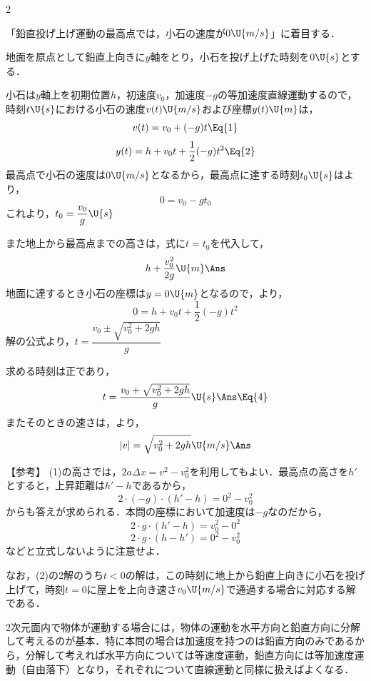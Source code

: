 \begin{multicols}{2}
\begin{sisin}
「鉛直投げ上げ運動の最高点では，小石の速度が$0\U{m/s}$」に着目する．
\end{sisin}
\par\nopagebreak
\hspace{1zw}地面を原点として鉛直上向きに$y$軸をとり，小石を投げ上げた時刻を$0\U{s}$とする．
\begin{komon}
 小石は$y$軸上を初期位置$h$，初速度$v_0$，加速度$-g$の等加速度直線運動するので，時刻$t\U{s}$における小石の速度$v(t)\U{m/s}$および座標$y(t)\U{m}$は，
       \[v(t)=v_0+(-g)t\Eq{1}\]
       \[y(t)=h+v_0t+\frac{1}{2}(-g)t^2\Eq{2}\]
       \hspace{1zw}最高点で小石の速度は$0\U{m/s}$となるから，最高点に達する時刻$t_0\U{s}$はより，
       \[0=v_0-gt_0\]
       これより，$t_0=\dfrac{v_0}{g}\U{s}$\Ans{}\par
       \hspace{1zw}また地上から最高点までの高さは，式に$t=t_0$を代入して，
       \[h+\frac{v_0^2}{2g}\U{m}\Ans\]
 地面に達するとき小石の座標は$y=0\U{m}$となるので，より，
       \[0=h+v_0t+\frac{1}{2}(-g)t^2\]
       解の公式より，$t=\dfrac{v_0\pm\sqrt{v_0^2+2gh}}{g}$\par
       求める時刻は正であり，
       \[t=\frac{v_0+\sqrt{v_0^2+2gh}}{g}\U{s}\Ans\Eq{4}\]
       またそのときの速さは，より，
       \[|v|=\sqrt{v_0^2+2gh}\U{m/s}\Ans\]
\end{komon}
\begin{itembox}[l]{【参考】}
\hspace{1zw}(1)の高さでは，$2a\Delta x=v^2-v_0^2$を利用してもよい．最高点の高さを$h'$とすると，上昇距離は$h'-h$であるから，
\[2\cdot(-g)\cdot(h'-h)=0^2-v_0^2\]
からも答えが求められる．本問の座標において加速度は$-g$なのだから，
\[2\cdot g\cdot(h'-h)=v_0^2-0^2\]
\[2\cdot g\cdot(h-h')=0^2-v_0^2\]
などと立式しないように注意せよ．

\hspace{1zw}なお，(2)の2解のうち$t<0$の解は，この時刻に地上から鉛直上向きに小石を投げ上げて，時刻$t=0$に屋上を上向き速さ$v_0\U{m/s}$で通過する場合に対応する解である．
\end{itembox}

\par\nopagebreak
\begin{sisin}
2次元面内で物体が運動する場合には，物体の運動を水平方向と鉛直方向に分解して考えるのが基本．特に本問の場合は加速度を持つのは鉛直方向のみであるから，分解して考えれば水平方向については等速度運動，鉛直方向には等加速度運動（自由落下）となり，それぞれについて直線運動と同様に扱えばよくなる．


\end{sisin}
\end{multicols}
